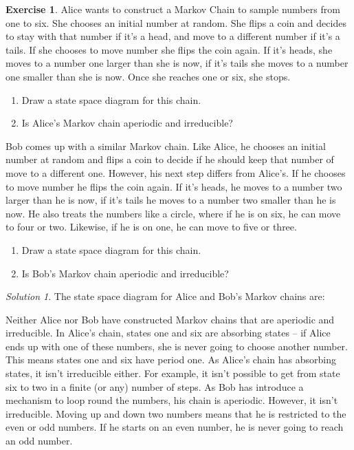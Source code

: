 \documentclass[
]{book}
\providecommand{\tightlist}{%
  \setlength{\itemsep}{0pt}\setlength{\parskip}{0pt}}
\theoremstyle{definition}
\theoremstyle{definition}
\theoremstyle{definition}
\newtheorem{exercise}{Exercise}[chapter]
\theoremstyle{definition}
\theoremstyle{remark}
\newtheorem*{solution}{Solution}
\begin{document}
\begin{exercise}

Alice wants to construct a Markov Chain to sample numbers from one to six. She chooses an initial number at random. She flips a coin and decides to stay with that number if it's a head, and move to a different number if it's a tails. If she chooses to move number she flips the coin again. If it's heads, she moves to a number one larger than she is now, if it's tails she moves to a number one smaller than she is now. Once she reaches one or six, she stops.

\begin{enumerate}
\def\labelenumi{\arabic{enumi}.}
\tightlist
\item
  Draw a state space diagram for this chain.
\item
  Is Alice's Markov chain aperiodic and irreducible?
\end{enumerate}

Bob comes up with a similar Markov chain. Like Alice, he chooses an initial number at random and flips a coin to decide if he should keep that number of move to a different one. However, his next step differs from Alice's. If he chooses to move number he flips the coin again. If it's heads, he moves to a number two larger than he is now, if it's tails he moves to a number two smaller than he is now. He also treats the numbers like a circle, where if he is on six, he can move to four or two. Likewise, if he is on one, he can move to five or three.

\begin{enumerate}
\def\labelenumi{\arabic{enumi}.}
\tightlist
\item
  Draw a state space diagram for this chain.
\item
  Is Bob's Markov chain aperiodic and irreducible?
\end{enumerate}

\end{exercise}

\begin{solution}
The state space diagram for Alice and Bob's Markov chains are:

Neither Alice nor Bob have constructed Markov chains that are aperiodic and irreducible. In Alice's chain, states one and six are absorbing states -- if Alice ends up with one of these numbers, she is never going to choose another number. This means states one and six have period one. As Alice's chain has absorbing states, it isn't irreducible either. For example, it isn't possible to get from state six to two in a finite (or any) number of steps. As Bob has introduce a mechanism to loop round the numbers, his chain is aperiodic. However, it isn't irreducible. Moving up and down two numbers means that he is restricted to the even or odd numbers. If he starts on an even number, he is never going to reach an odd number.
\end{solution}
\end{document}

